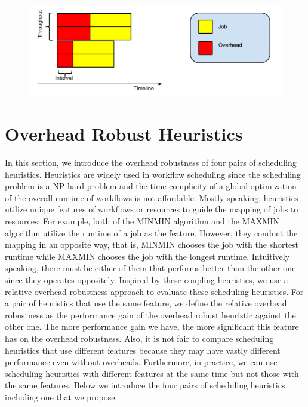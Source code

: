 \documentclass[final]{IEEEtran}
\begin{document}
\begin{figure}[htb]
\centering
 \includegraphics[width=1\linewidth]{figure/incremental.pdf}
  \label{fig:ipp}
  \vspace{-10pt}
\end{figure}

\section{Overhead Robust Heuristics}

In this section, we introduce the overhead robustness of four pairs of scheduling heuristics. Heuristics are widely used in workflow scheduling since the scheduling problem is a NP-hard problem and the time complicity of a global optimization of the overall runtime of workflows is not affordable. Mostly speaking, heuristics utilize unique features of workflows or resources to guide the mapping of jobs to resources. For example, both of the MINMIN algorithm and the MAXMIN algorithm utilize the runtime of a job as the feature. However, they conduct the mapping in an opposite way, that is, MINMIN chooses the job with the shortest runtime while MAXMIN chooses the job with the longest runtime. Intuitively speaking, there must be either of them that performs better than the other one since they operates oppositely. Inspired by these coupling heuristics, we use a relative overhead robustness approach to evaluate these scheduling heuristics. For a pair of heuristics that use the same feature, we define the relative overhead robustness as the performance gain of the overhead robust heuristic against the other one. The more performance gain we have, the more significant this feature has on the overhead robustness. Also, it is not fair to compare scheduling heuristics that use different features because they may have vastly different performance even without overheads. Furthermore, in practice, we can use scheduling heuristics with different features at the same time but not those with the same features. 
Below we introduce the four pairs of scheduling heuristics including one that we propose. 
\end{document}
